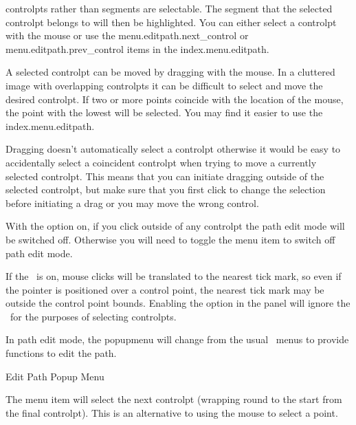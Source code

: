\begin{information}
\Glspl{controlpt} rather than segments are selectable. The segment
that the selected \gls{controlpt} belongs to will then be
highlighted. You can either select a \gls{controlpt} with the mouse
or use the \gls{menu.editpath.next_control} or \gls{menu.editpath.prev_control}
items in the \gls{index.menu.editpath}.
\end{information}

A selected \gls{controlpt} can be moved by dragging with the mouse.
In a cluttered image with overlapping \glspl{controlpt} it can be
difficult to select and move the desired \gls{controlpt}.
If two or more points coincide
with the location of the mouse, the point with the lowest
 will be selected.
You may find it easier to use the \gls{index.menu.editpath}.

Dragging doesn't automatically select a \gls{controlpt} otherwise it
would be easy to accidentally select a coincident \gls{controlpt}
when trying to move a currently selected \gls{controlpt}.
This means that you can initiate dragging outside of the selected
\gls*{controlpt}, but make sure that you
first click to change the selection before initiating a drag or you
may move the wrong control.

\begin{important}
With the  option on, if you
click outside of any \gls{controlpt} the path edit mode will be
switched off. Otherwise you will need to toggle the
 menu item to switch off path edit mode.
\end{important}

If the \gridlock\ is on, mouse clicks will be translated to the
nearest tick mark, so even if the pointer is positioned over a
control point, the nearest tick mark may be outside the control
point bounds. Enabling the  option in 
the  panel will ignore the \gridlock\ for the
purposes of selecting \glspl{controlpt}.


In path edit mode, the \gls{popupmenu} will change from the usual
\selectmode\ menus to provide functions to edit the \gls{path}.

 {}
 {Edit Path Popup Menu}


The  menu item will select the next \gls{controlpt}
(wrapping round to the start from the final \gls{controlpt}).
This is an alternative to using the mouse to select a point.

